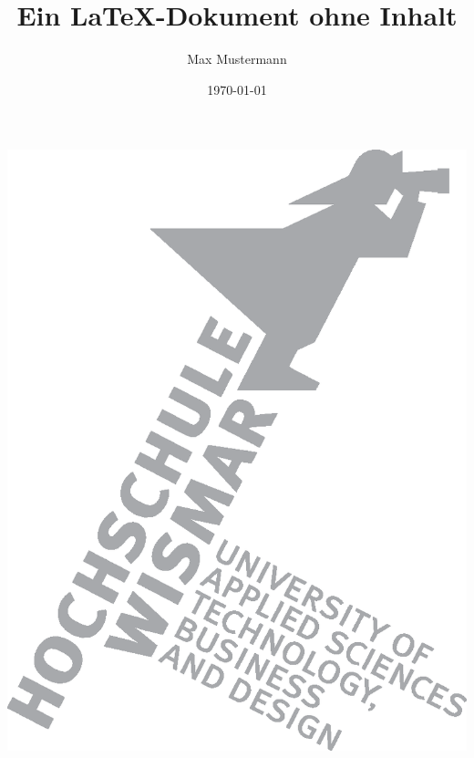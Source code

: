 \documentclass{../hswarticle}
\title{Ein \LaTeX -Dokument ohne Inhalt}
\author{Max Mustermann}
\date{\today}
\begin{document}
    \maketitle
    \begin{center}
        \includegraphics[scale=0.4]{hsw-all-light.eps}
    \end{center}
\end{document}
